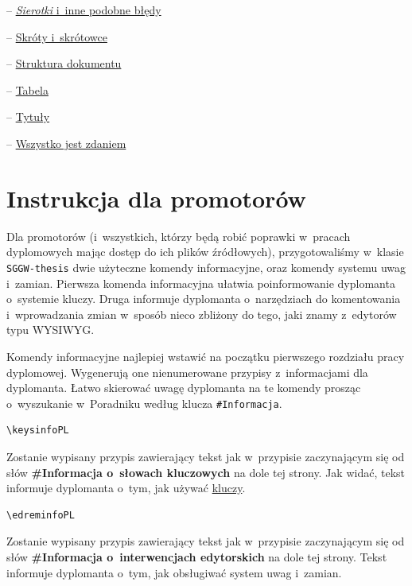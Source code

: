 \begin{description}
  \item{} -- \hyperref[sec:dod:sierotki]{{\em Sierotki} i~inne podobne błędy}
  \item{} -- \hyperref[sec:dod:skroty]{Skróty i~skrótowce}
  \item{} -- \hyperref[sec:dod:struktura]{Struktura dokumentu}
  \item{} -- \hyperref[sec:dod:tabela]{Tabela}
  \item{} -- \hyperref[sec:dod:tytul]{Tytuły}
  \item{} -- \hyperref[sec:dod:zdaniem]{Wszystko jest zdaniem}
\end{description}


\newpage

\section{Instrukcja dla promotorów}
\label{sec:dod:instrukcja-promotorzy}

Dla promotorów (i~wszystkich, którzy będą robić poprawki w~pracach dyplomowych mając dostęp do ich plików źródłowych), przygotowaliśmy w~klasie {\tt SGGW-thesis} dwie użyteczne komendy informacyjne, oraz komendy systemu uwag i~zamian. Pierwsza komenda informacyjna ułatwia poinformowanie dyplomanta o~systemie kluczy. Druga informuje dyplomanta o~narzędziach do komentowania i~wprowadzania zmian w~sposób nieco zbliżony do tego, jaki znamy z~edytorów typu WYSIWYG. 

Komendy informacyjne najlepiej wstawić na początku pierwszego rozdziału pracy dyplomowej. Wygenerują one nienumerowane przypisy z~informacjami dla dyplomanta. Łatwo skierować uwagę dyplomanta na te komendy prosząc o~wyszukanie w~Poradniku według klucza {\tt \#{}Informacja}.
\begin{verbatim}
\keysinfoPL
\end{verbatim}
Zostanie wypisany przypis zawierający tekst jak w~przypisie zaczynającym się od słów {\color{ColorRemark}\bf \#{}Informacja o~słowach kluczowych} na dole tej strony\keysinfoPL. Jak widać, tekst informuje dyplomanta o~tym, jak używać \hyperref[sec:dod:klucze]{kluczy}.
\begin{verbatim}
\edreminfoPL
\end{verbatim}
Zostanie wypisany przypis zawierający tekst jak w~przypisie zaczynającym się od słów {\color{ColorRemark}\bf \#{}Informacja o~interwencjach edytorskich} na dole tej strony\edreminfoPL{}. Tekst informuje dyplomanta o~tym, jak obsługiwać system uwag i~zamian.



